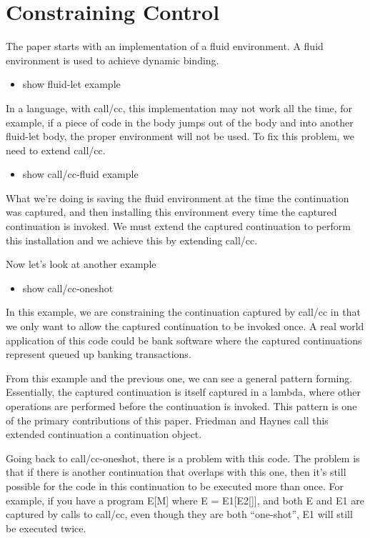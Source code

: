 \documentclass[letterpaper]{llncs}
\begin{document}
\section*{Constraining Control}%

The paper starts with an implementation of a fluid environment. A fluid environment is used to achieve dynamic binding.

\begin{itemize}
	\item show fluid-let example
\end{itemize}

In a language, with call/cc, this implementation may not work all the time, for example, if a piece of code in the body jumps out of the body and into another fluid-let body, the proper environment will not be used. To fix this problem, we need to extend call/cc.

\begin{itemize}
	\item show call/cc-fluid example
\end{itemize}

What we're doing is saving the fluid environment at the time the continuation was captured, and then installing this environment every time the captured continuation is invoked. We must extend the captured continuation to perform this installation and we achieve this by extending call/cc.

Now let's look at another example

\begin{itemize}
	\item show call/cc-oneshot
\end{itemize}


In this example, we are constraining the continuation captured by call/cc in that we only want to allow the captured continuation to be invoked once. A real world application of this code could be bank software where the captured continuations represent queued up banking transactions. 

From this example and the previous one, we can see a general pattern forming. Essentially, the captured continuation is itself captured in a lambda, where other operations are performed before the continuation is invoked. This pattern is one of the primary contributions of this paper. Friedman and Haynes call this extended continuation a continuation object.

Going back to call/cc-oneshot, there is a problem with this code. The problem is that if there is another continuation that overlaps with this one, then it's still possible for the code in this continuation to be executed more than once. For example, if you have a program E[M] where E = E1[E2[]], and both E and E1 are captured by calls to call/cc, even though they are both ``one-shot'', E1 will still be executed twice.
\end{document}
